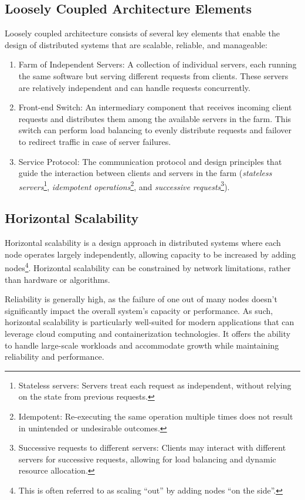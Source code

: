 \documentclass{report}
\begin{document}
\subsection{Loosely Coupled Architecture Elements}
Loosely coupled architecture consists of several key elements that enable the design of distributed
systems that are scalable, reliable, and manageable:

\begin{enumerate}[label=\textit{(\roman*)}]
\item Farm of Independent Servers: A collection of individual servers, each running the
  same software but serving different requests from clients. These servers are relatively independent
  and can handle requests concurrently.
\item Front-end Switch: An intermediary component that receives incoming client
  requests and distributes them among the available servers in the farm. This switch can perform load
  balancing to evenly distribute requests and failover to redirect traffic in case of server failures.
\item Service Protocol: The communication protocol and design principles that guide the interaction
  between clients and servers in the farm (\textit{stateless servers}\footnote{Stateless servers:
    Servers treat each request as independent, without relying on the state from previous requests.},
  \textit{idempotent operations}\footnote{Idempotent: Re-executing the same operation multiple times
    does not result in unintended or undesirable outcomes.}, and \textit{successive
    requests}\footnote{Successive requests to different servers: Clients may interact with different
    servers for successive requests, allowing for load balancing and dynamic resource allocation.}).
\end{enumerate}
  

\subsection{Horizontal Scalability}
Horizontal scalability is a design approach in distributed systems where each node operates largely
independently, allowing capacity to be increased by adding nodes\footnote{This is often referred to as
scaling ``out'' by adding nodes ``on the side''.}. Horizontal scalability can be constrained by network
limitations, rather than hardware or algorithms.

Reliability is generally high, as the failure of one out of many nodes doesn't significantly impact
the overall system's capacity or performance. As such, horizontal scalability is particularly
well-suited for modern applications that can leverage cloud computing and containerization
technologies. It offers the ability to handle large-scale workloads and accommodate growth while
maintaining reliability and performance.
\end{document}
